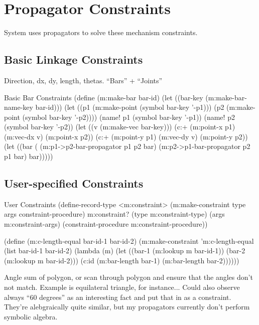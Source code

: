 \section{Propagator Constraints}

System uses propagators to solve these mechanism constraints.

\subsection{Basic Linkage Constraints}

Direction, dx, dy, length, thetas. ``Bars'' + ``Joints''

\begin{code-listing}{Basic Bar Constraints}
(define (m:make-bar bar-id)
  (let ((bar-key (m:make-bar-name-key bar-id)))
    (let ((p1 (m:make-point (symbol bar-key '-p1)))
          (p2 (m:make-point (symbol bar-key '-p2))))
      (name! p1 (symbol bar-key '-p1))
      (name! p2 (symbol bar-key '-p2))
      (let ((v (m:make-vec bar-key)))
        (c:+ (m:point-x p1)
             (m:vec-dx v)
             (m:point-x p2))
        (c:+ (m:point-y p1)
             (m:vec-dy v)
             (m:point-y p2))
        (let ((bar (%
          (m:p1->p2-bar-propagator p1 p2 bar)
          (m:p2->p1-bar-propagator p2 p1 bar)
          bar)))))
\end{code-listing}

\subsection{User-specified Constraints}

\begin{code-listing}{User Constraints}
(define-record-type <m:constraint>
  (m:make-constraint type args constraint-procedure)
  m:constraint?
  (type m:constraint-type)
  (args m:constraint-args)
  (constraint-procedure m:constraint-procedure))

(define (m:c-length-equal bar-id-1 bar-id-2)
  (m:make-constraint
   'm:c-length-equal
   (list bar-id-1 bar-id-2)
   (lambda (m)
     (let ((bar-1 (m:lookup m bar-id-1))
           (bar-2 (m:lookup m bar-id-2)))
       (c:id
        (m:bar-length bar-1)
        (m:bar-length bar-2))))))
\end{code-listing}

Angle sum of polygon, or scan through polygon and ensure that the
angles don't not match. Example is equilateral triangle, for
instance... Could also observe always ``60 degrees'' as an interesting
fact and put that in as a constraint. They're alebgraically quite
similar, but my propagators currently don't perform symbolic algebra.

